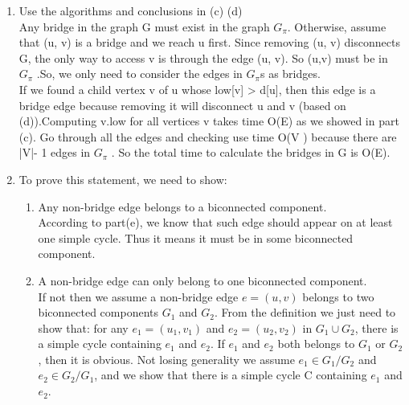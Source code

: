 \documentclass[paper=a4, fontsize=11pt]{scrartcl} %
\numberwithin{equation}{section} %
\numberwithin{figure}{section} %
\numberwithin{table}{section} %
\begin{document}
\begin{enumerate}[label={2.(\alph*)}]
  \item 
Use the algorithms and conclusions in (c)  (d)\\
Any bridge in the graph G must exist in the graph ${G_\pi}$. Otherwise, assume that (u, v) is a bridge and  we reach u first. Since removing (u, v) disconnects G, the only way to access v is through the edge (u, v). So (u,v) must be in ${G_\pi}$ .So, we only need to consider the edges in ${G_\pi}$s as bridges. \\
If we found a child vertex v of u whose low[v] > d[u], then  this edge is a  bridge edge because removing it will disconnect u and v (based on (d)).Computing v.low for all vertices v takes time O(E) as we showed in part (c). Go through all the edges and checking use time O(V ) because  there are |V|- 1 edges in ${G_\pi}$ . So the total time to calculate the bridges in G is O(E).


  \item 

  To prove this statement, we need to show:
  \begin{enumerate}
    \item Any non-bridge edge belongs to a biconnected component.\\
      According to part(e), we know that such edge should appear on at least one simple cycle. Thus it means it must be in some biconnected component.
    \item A non-bridge edge can only belong to one biconnected component.\\
      If not then we assume a non-bridge edge $e=(u,v)$ belongs to two
      biconnected components $G_1$ and $G_2$. From the definition we just need
      to show that: for any $e_1=(u_1,v_1)$ and $e_2=(u_2,v_2)$ in $G_1 \cup G_2$, there is a
      simple cycle containing $e_1$ and $e_2$. If $e_1$ and $e_2$ both belongs
      to $G_1$ or $G_2$, then it is obvious.  Not losing generality we assume
      $e_1 \in G_1/G_2$ and $e_2 \in G_2/G_1$, and we show that there is a
      simple cycle C containing $e_1$ and $e_2$.\\


\end{enumerate}
\end{enumerate}
\end{document}
